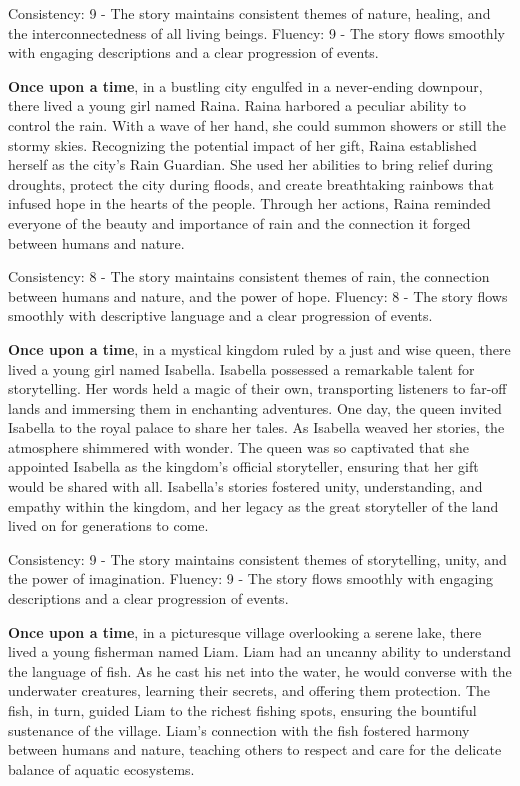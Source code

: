 \documentclass{article}
\begin{document}
Consistency: 9 - The story maintains consistent themes of nature, healing, and the interconnectedness of all living beings.
Fluency: 9 - The story flows smoothly with engaging descriptions and a clear progression of events.

\textbf{Once upon a time}, in a bustling city engulfed in a never-ending downpour, there lived a young girl named Raina. Raina harbored a peculiar ability to control the rain. With a wave of her hand, she could summon showers or still the stormy skies. Recognizing the potential impact of her gift, Raina established herself as the city's Rain Guardian. She used her abilities to bring relief during droughts, protect the city during floods, and create breathtaking rainbows that infused hope in the hearts of the people. Through her actions, Raina reminded everyone of the beauty and importance of rain and the connection it forged between humans and nature.

Consistency: 8 - The story maintains consistent themes of rain, the connection between humans and nature, and the power of hope.
Fluency: 8 - The story flows smoothly with descriptive language and a clear progression of events.

\textbf{Once upon a time}, in a mystical kingdom ruled by a just and wise queen, there lived a young girl named Isabella. Isabella possessed a remarkable talent for storytelling. Her words held a magic of their own, transporting listeners to far-off lands and immersing them in enchanting adventures. One day, the queen invited Isabella to the royal palace to share her tales. As Isabella weaved her stories, the atmosphere shimmered with wonder. The queen was so captivated that she appointed Isabella as the kingdom's official storyteller, ensuring that her gift would be shared with all. Isabella's stories fostered unity, understanding, and empathy within the kingdom, and her legacy as the great storyteller of the land lived on for generations to come.

Consistency: 9 - The story maintains consistent themes of storytelling, unity, and the power of imagination.
Fluency: 9 - The story flows smoothly with engaging descriptions and a clear progression of events.

\textbf{Once upon a time}, in a picturesque village overlooking a serene lake, there lived a young fisherman named Liam. Liam had an uncanny ability to understand the language of fish. As he cast his net into the water, he would converse with the underwater creatures, learning their secrets, and offering them protection. The fish, in turn, guided Liam to the richest fishing spots, ensuring the bountiful sustenance of the village. Liam's connection with the fish fostered harmony between humans and nature, teaching others to respect and care for the delicate balance of aquatic ecosystems.
\end{document}
